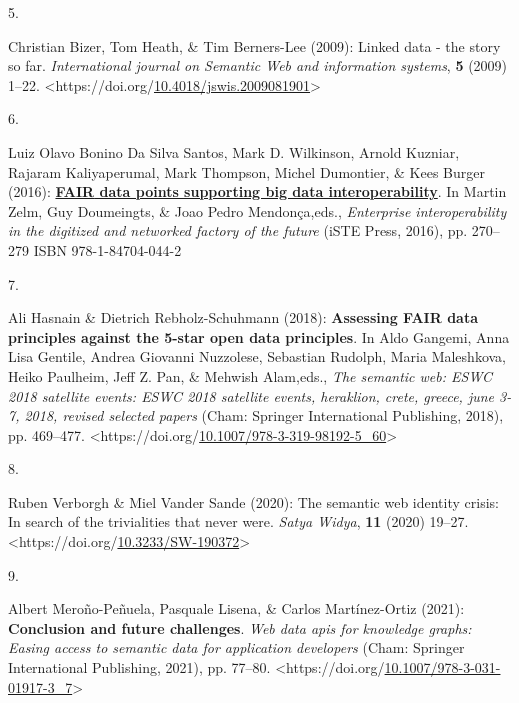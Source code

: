 \begin{thebibliography}{9}
\hypertarget{ref-bizerLinkedDataStory2009a}{}
5.

Christian Bizer, Tom Heath, \& Tim Berners-Lee (2009): Linked data - the
story so far. \emph{International journal on Semantic Web and
information systems}, \textbf{5} (2009) 1--22.
\textless https://doi.org/\href{https://doi.org/10.4018/jswis.2009081901}{10.4018/jswis.2009081901}\textgreater{}

\hypertarget{ref-boninodasilvasantosFAIRDataPoints2016a}{}
6.

Luiz Olavo Bonino Da Silva Santos, Mark D. Wilkinson, Arnold Kuzniar,
Rajaram Kaliyaperumal, Mark Thompson, Michel Dumontier, \& Kees Burger
(2016):
\textbf{\href{https://www.researchgate.net/publication/309468587_FAIR_Data_Points_Supporting_Big_Data_Interoperability}{{FAIR}
data points supporting big data interoperability}}. In Martin Zelm, Guy
Doumeingts, \& Joao Pedro Mendonça,eds., \emph{Enterprise
interoperability in the digitized and networked factory of the future}
({iSTE Press}, 2016), pp. 270--279 ISBN 978-1-84704-044-2

\hypertarget{ref-hasnainAssessingFAIRData2018a}{}
7.

Ali Hasnain \& Dietrich Rebholz-Schuhmann (2018): \textbf{Assessing
{FAIR} data principles against the 5-star open data principles}. In Aldo
Gangemi, Anna Lisa Gentile, Andrea Giovanni Nuzzolese, Sebastian
Rudolph, Maria Maleshkova, Heiko Paulheim, Jeff Z. Pan, \& Mehwish
Alam,eds., \emph{The semantic web: {ESWC} 2018 satellite events: {ESWC}
2018 satellite events, heraklion, crete, greece, june 3-7, 2018, revised
selected papers} ({Cham}: {Springer International Publishing}, 2018),
pp. 469--477.
\textless https://doi.org/\href{https://doi.org/10.1007/978-3-319-98192-5_60}{10.1007/978-3-319-98192-5\_60}\textgreater{}

\hypertarget{ref-verborghSemanticWebIdentity2020a}{}
8.

Ruben Verborgh \& Miel Vander Sande (2020): The semantic web identity
crisis: {In} search of the trivialities that never were. \emph{Satya
Widya}, \textbf{11} (2020) 19--27.
\textless https://doi.org/\href{https://doi.org/10.3233/SW-190372}{10.3233/SW-190372}\textgreater{}

\hypertarget{ref-merono-penuelaConclusionFutureChallenges2021a}{}
9.

Albert Meroño-Peñuela, Pasquale Lisena, \& Carlos Martínez-Ortiz (2021):
\textbf{Conclusion and future challenges}. \emph{Web data apis for
knowledge graphs: {Easing} access to semantic data for application
developers} ({Cham}: {Springer International Publishing}, 2021), pp.
77--80.
\textless https://doi.org/\href{https://doi.org/10.1007/978-3-031-01917-3_7}{10.1007/978-3-031-01917-3\_7}\textgreater{}


\end{thebibliography}
